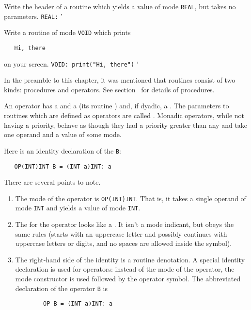 \begin{exercise}
\item Write the header of a routine which yields a value of mode
\verb|REAL|, but takes no parameters. \ans \verb|REAL:|
'
\item Write a routine of mode \verb|VOID| which prints
\begin{verbatim}
   Hi, there
\end{verbatim}
\noindent
on your screen. \ans \verb|VOID: print("Hi, there")|
'
\end{exercise}

In the preamble to this chapter, it was mentioned that routines
consist of two kinds: procedures and operators. See
section~ for details of procedures.

An operator has a  and a
 (its routine
) and, if dyadic, a
.
The parameters to routines which are defined as operators are called
. Monadic operators, while not having a
priority, behave as though they had a priority greater than any
 and take one operand and
 a value of some mode.

Here is an identity declaration of the
 \verb|B|:
\begin{verbatim}
   OP(INT)INT B = (INT a)INT: a
\end{verbatim}
\noindent
There are several points to note.
\begin{enumerate}
\item The mode of the operator is \verb|OP(INT)INT|. That is,
it takes a single operand of mode \verb|INT| and yields a value of
mode \verb|INT|.
\item The  for the operator looks
like a .  It isn't a mode
indicant, but obeys the same rules (starts with an uppercase letter
and possibly continues with uppercase letters or digits, and no
spaces are allowed inside the symbol).
\item The right-hand side of the identity
 is a routine
denotation.  A special identity declaration is used for operators:
instead of the mode of the operator, the mode constructor 
is used followed by the operator symbol. The abbreviated declaration
of the operator \verb|B| is
\begin{verbatim}
        OP B = (INT a)INT: a
\end{verbatim}
\end{enumerate}

